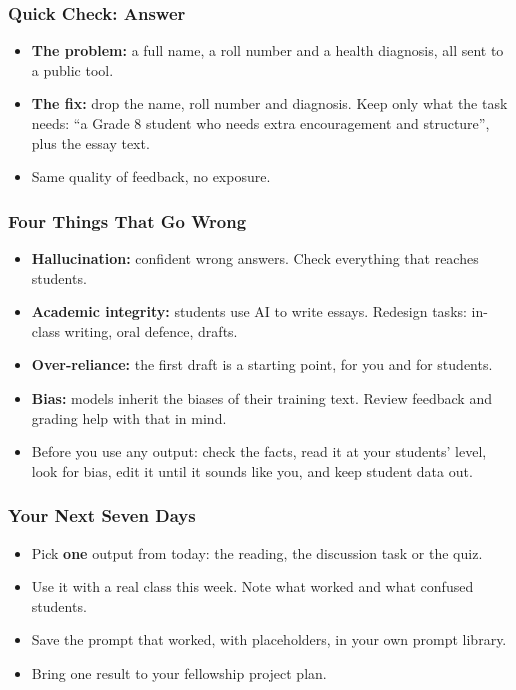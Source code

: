 \begin{frame}[fragile]\frametitle{Quick Check: Answer}
\begin{itemize}
\item \textbf{The problem:} a full name, a roll number and a health diagnosis, all sent to a public tool.
\item \textbf{The fix:} drop the name, roll number and diagnosis. Keep only what the task needs: ``a Grade 8 student who needs extra encouragement and structure'', plus the essay text.
\item Same quality of feedback, no exposure.
\end{itemize}
\end{frame}

\begin{frame}[fragile]\frametitle{Four Things That Go Wrong}
\begin{itemize}
\item \textbf{Hallucination:} confident wrong answers. Check everything that reaches students.
\item \textbf{Academic integrity:} students use AI to write essays. Redesign tasks: in-class writing, oral defence, drafts.
\item \textbf{Over-reliance:} the first draft is a starting point, for you and for students.
\item \textbf{Bias:} models inherit the biases of their training text. Review feedback and grading help with that in mind.
\item Before you use any output: check the facts, read it at your students' level, look for bias, edit it until it sounds like you, and keep student data out.
\end{itemize}
\end{frame}

\begin{frame}[fragile]\frametitle{Your Next Seven Days}
\begin{itemize}
\item Pick \textbf{one} output from today: the reading, the discussion task or the quiz.
\item Use it with a real class this week. Note what worked and what confused students.
\item Save the prompt that worked, with placeholders, in your own prompt library.
\item Bring one result to your fellowship project plan.
\end{itemize}
\end{frame}

